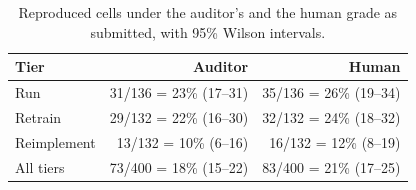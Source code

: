 \begin{table}[ht]
\centering
\small
\begin{tabular}{@{}lrr@{}}
\toprule
Tier & Auditor & Human \\
\midrule
Run         & 31/136 = 23\% (17--31) & 35/136 = 26\% (19--34) \\
Retrain     & 29/132 = 22\% (16--30) & 32/132 = 24\% (18--32) \\
Reimplement & 13/132 = 10\% (6--16)  & 16/132 = 12\% (8--19) \\
\midrule
All tiers   & 73/400 = 18\% (15--22) & 83/400 = 21\% (17--25) \\
\bottomrule
\end{tabular}
\caption{Reproduced cells under the auditor's and the human grade as submitted,
with 95\% Wilson intervals.}
\label{tab:auditor-rates}
\end{table}


